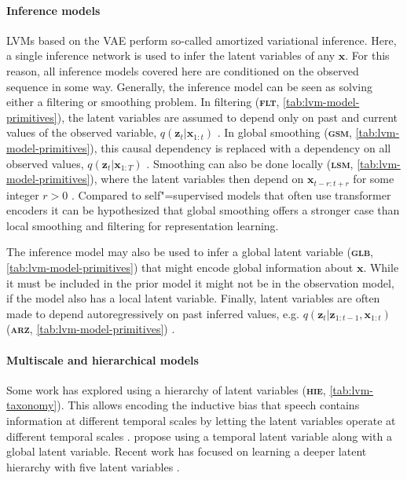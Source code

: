 {\paragraph{Inference models} 
LVMs based on the VAE perform so-called amortized variational inference. Here, a single inference network is used to infer the latent variables of any $\mathbf{x}$. 
For this reason, all inference models covered here are conditioned on the observed sequence in some way. Generally, the inference model can be seen as solving either a filtering or smoothing problem.
In filtering (\textbf{\textsc{flt}}, \cref{tab:lvm-model-primitives}), the latent variables are assumed to depend only on past and current values of the observed variable, $q(\mathbf{z}_t|\mathbf{x}_{1:t})$ \parencite{chung_recurrent_2015, khurana_convolutional_2020}. In global smoothing (\textbf{\textsc{gsm}}, \cref{tab:lvm-model-primitives}), this causal dependency is replaced with a dependency on all observed values, $q(\mathbf{z}_t|\mathbf{x}_{1:T})$ \parencite{fraccaro_sequential_2016, hsu_learning_2017}. 
Smoothing can also be done locally (\textbf{\textsc{lsm}}, \cref{tab:lvm-model-primitives}), where the latent variables then depend on $\mathbf{x}_{t-r:t+r}$ for some integer $r>0$ \parencite{oord_neural_2018}. Compared to self"=supervised models that often use transformer encoders it can be hypothesized that global smoothing offers a stronger case than local smoothing and filtering for representation learning.

The inference model may also be used to infer a global latent variable (\textbf{\textsc{glb}}, \cref{tab:lvm-model-primitives}) that might encode global information about $\mathbf{x}$. 
While it must be included in the prior model it might not be in the observation model, if the model also has a local latent variable. 
Finally, latent variables are often made to depend autoregressively on past inferred values, e.g. $q(\mathbf{z}_t|\mathbf{z}_{1:t-1},\mathbf{x}_{1:t})$ (\textbf{\textsc{arz}}, \cref{tab:lvm-model-primitives}) \parencite{chung_recurrent_2015, fraccaro_sequential_2016}.

\paragraph{Multiscale and hierarchical models} 
Some work has explored using a hierarchy of latent variables (\textbf{\textsc{hie}}, \cref{tab:lvm-taxonomy}). This allows encoding the inductive bias that speech contains information at different temporal scales by letting the latent variables operate at different temporal scales \parencite{hsu_unsupervised_2017}. \textcite{khurana_factorial_2019} propose using a temporal latent variable along with a global latent variable. 
Recent work has focused on learning a deeper latent hierarchy with five latent variables \parencite{aksan_stcn_2019}. 

}
